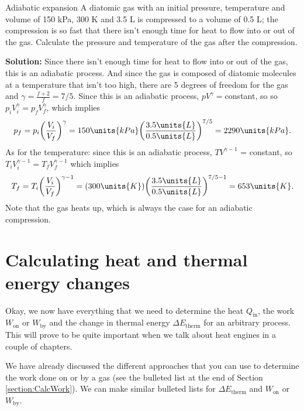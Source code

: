 \begin{example}{Adiabatic expansion}
A diatomic gas with an initial pressure, temperature and volume of 150 kPa,
300 K and 3.5 L is compressed to a volume of 0.5 L; the compression is
so fast that there isn't enough time for heat to flow into or out
of the gas. Calculate the pressure and temperature of the gas after the
compression.

{\bf Solution:} Since there isn't enough time for heat to flow into or
out of the gas, this is an adiabatic process.  And since the gas is
composed of diatomic molecules at a temperature that isn't too high,
there are 5 degrees of freedom for the gas and $\gamma = \frac{f+2}{f} = 7/5$.
Since this is an adiabatic process, $pV^{\gamma} = $constant, so
so $p_iV_i^\gamma = p_fV_f^\gamma$, which implies
\begin{equation}
 p_f=p_i\biggl(\frac{V_i}{V_f}\biggr)^\gamma
= 150 \units{kPa}\biggl(\frac{3.5 \units{L}}{0.5 \units{L}}\biggr)^{7/5} = 
2290\units{kPa}.
\end{equation}
As for the temperature:  since this is an adiabatic process, $TV^{\gamma - 1}$
= constant, so $T_iV_i^{\gamma - 1} = T_fV_f^{\gamma - 1}$ which implies
\begin{equation}
T_f = T_i\biggl(\frac{V_i}{V_f}\biggr)^{\gamma - 1} = (300 \units{K})\biggl(\frac{3.5 \units{L}}{0.5 \units{L}}\biggr)^{7/5-1} = 653 \units{K}.
\end{equation}  Note that the gas heats up, which is 
always the case for an adiabatic compression.
\end{example}

\section{Calculating heat and thermal energy changes}

Okay, we now have everything that we need to determine 
the heat $Q_\text{in}$, the work $W_\text{on}$ or $W_\text{by}$ and the change in
thermal energy $\Delta E_\text{therm}$ for an arbitrary process. This
will prove to be quite important when we talk about heat engines
in a couple of chapters.

We have already discussed the different approaches that you can use
to determine the work done on or by a gas (see the bulleted list at the
end of Section \ref{section:CalcWork}). We can make similar
bulleted lists for $\Delta E_\text{therm}$ and $W_\text{on}$ or $W_\text{by}$.

